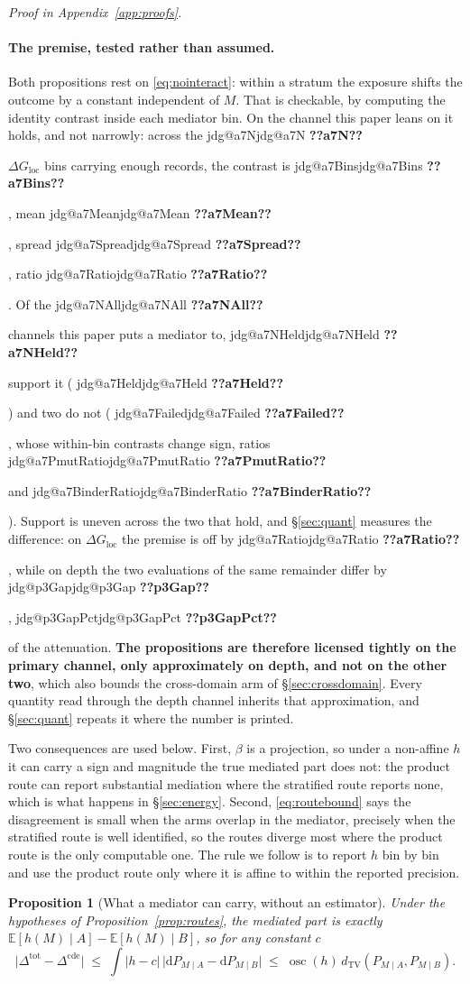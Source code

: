 \documentclass[11pt]{article}
\makeatletter
\newtheorem{proposition}{Proposition}
\newcommand{\jdg}[1]{%
  \ifcsname jdg@#1\endcsname\csname jdg@#1\endcsname
  \else\textbf{??#1??}\PackageError{rna}{undefined measured quantity #1}{}\fi}
\makeatother
\begin{document}
\noindent\emph{Proof in Appendix~\ref{app:proofs}.}

\paragraph{The premise, tested rather than assumed.} Both propositions rest on
\eqref{eq:nointeract}: within a stratum the exposure shifts the outcome by a constant independent
of $M$. That is checkable, by computing the identity contrast inside each mediator bin. On the channel this
paper leans on it holds, and not narrowly: across the \jdg{a7N}
$\Delta G_{\mathrm{loc}}$ bins carrying enough records, the contrast is \jdg{a7Bins}, mean
\jdg{a7Mean}, spread \jdg{a7Spread}, ratio \jdg{a7Ratio}. Of the \jdg{a7NAll} channels this paper
puts a mediator to, \jdg{a7NHeld} support it (\jdg{a7Held}) and two do not (\jdg{a7Failed}, whose
within-bin contrasts change sign, ratios \jdg{a7PmutRatio} and \jdg{a7BinderRatio}). Support is
uneven across the two that hold, and \S\ref{sec:quant} measures the difference: on
$\Delta G_{\mathrm{loc}}$ the premise is off by \jdg{a7Ratio}, while on depth the two evaluations
of the same remainder differ by \jdg{p3Gap}, \jdg{p3GapPct} of the attenuation. \textbf{The
propositions are therefore licensed tightly on the primary channel, only approximately on depth,
and not on the other two}, which also bounds the cross-domain arm of \S\ref{sec:crossdomain}. Every
quantity read through the depth channel inherits that approximation, and \S\ref{sec:quant} repeats
it where the number is printed.

\noindent Two consequences are used below. First, $\beta$ is a projection, so under a non-affine $h$ it can carry a sign and magnitude the true
mediated part does not: the product route can report substantial mediation where the stratified route
reports none, which is what happens in \S\ref{sec:energy}. Second, \eqref{eq:routebound} says the
disagreement is small when the arms overlap in the mediator, precisely when the stratified route is
well identified, so the routes diverge most where the product route is the only computable one. The
rule we follow is to report $h$ bin by bin and use the product route only where it is affine to
within the reported precision.

\begin{proposition}[What a mediator can carry, without an estimator]
\label{prop:carry}
Under the hypotheses of Proposition~\ref{prop:routes}, the mediated part is exactly
$\mathbb E[h(M)\mid A]-\mathbb E[h(M)\mid B]$, so for any constant $c$
\begin{equation}
\bigl|\Delta^{\mathrm{tot}}-\Delta^{\mathrm{cde}}\bigr|
\;\le\;\int\bigl|h-c\bigr|\,\bigl|\mathrm dP_{M\mid A}-\mathrm dP_{M\mid B}\bigr|
\;\le\;\operatorname{osc}(h)\,d_{\mathrm{TV}}\!\left(P_{M\mid A},P_{M\mid B}\right).
\label{eq:carrybound}
\end{equation}
\end{proposition}
\end{document}
